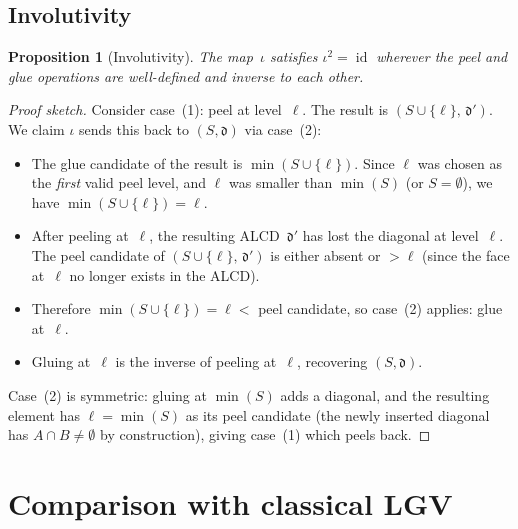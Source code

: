\documentclass[11pt]{article}
\DeclareMathOperator{\id}{id}
\theoremstyle{plain}
\newtheorem{proposition}[theorem]{Proposition}
\theoremstyle{definition}
\begin{document}
\subsection{Involutivity}

\begin{proposition}[Involutivity]
\label{prop:involutive}
The map~$\iota$ satisfies $\iota^2 = \id$ wherever the
peel and glue operations are well-defined and inverse to
each other.
\end{proposition}

\begin{proof}[Proof sketch]
Consider case~(1): peel at level~$\ell$.  The result is
$(S \cup \{\ell\},\, \mathfrak{d}')$.  We claim
$\iota$ sends this back to $(S, \mathfrak{d})$ via
case~(2):
\begin{itemize}
  \item The glue candidate of the result is
    $\min(S \cup \{\ell\})$.  Since $\ell$ was chosen
    as the \emph{first} valid peel level, and $\ell$
    was smaller than $\min(S)$ (or $S = \emptyset$),
    we have $\min(S \cup \{\ell\}) = \ell$.
  \item After peeling at~$\ell$, the resulting
    ALCD~$\mathfrak{d}'$ has lost the diagonal at
    level~$\ell$.  The peel candidate of
    $(S \cup \{\ell\},\, \mathfrak{d}')$ is either
    absent or $> \ell$ (since the face at~$\ell$ no
    longer exists in the ALCD).
  \item Therefore $\min(S \cup \{\ell\}) = \ell < $
    peel candidate, so case~(2) applies: glue at~$\ell$.
  \item Gluing at~$\ell$ is the inverse of peeling
    at~$\ell$, recovering $(S, \mathfrak{d})$.
\end{itemize}
Case~(2) is symmetric: gluing at $\min(S)$ adds a
diagonal, and the resulting element has $\ell = \min(S)$
as its peel candidate (the newly inserted diagonal has
$A \cap B \neq \emptyset$ by construction), giving
case~(1) which peels back.
\end{proof}


\section{Comparison with classical LGV}
\label{sec:LGV}
\end{document}
